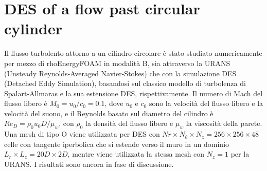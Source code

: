 \documentclass[a5paper]{sapthesis}
\begin{document}
	
	\section{DES of a flow past circular cylinder}
	Il flusso turbolento attorno a un cilindro circolare è stato studiato numericamente per mezzo di rhoEnergyFOAM in modalità B, sia attraverso la URANS (Unsteady Reynolds-Averaged Navier-Stokes) che con la simulazione DES (Detached Eddy Simulation), basandosi sul classico modello di turbolenza di Spalart-Allmaras e la sua estensione DES, rispettivamente. Il numero di Mach del flusso libero è $M_0 = u_0 /c_0 = 0.1$, dove $u_0$ e $c_0$ sono la velocità del flusso libero e la velocità del suono, e il Reynolds basato sul diametro del cilindro è $Re_D = \rho_0 u_0 D/ \mu_w$, con $\rho_0$ la densità del flusso libero e $\mu_w$ la viscosità della parete. Una mesh di tipo O viene utilizzata per DES con $Nr \times N_\theta \times N_z = 256 \times 256 \times 48$ celle con tangente iperbolica che si estende verso il muro in un dominio $L_r \times L_z = 20D \times 2D$, mentre viene utilizzata la stessa mesh con $N_z = 1$ per la URANS. I risultati sono ancora in fase di discussione.
	
\end{document}
